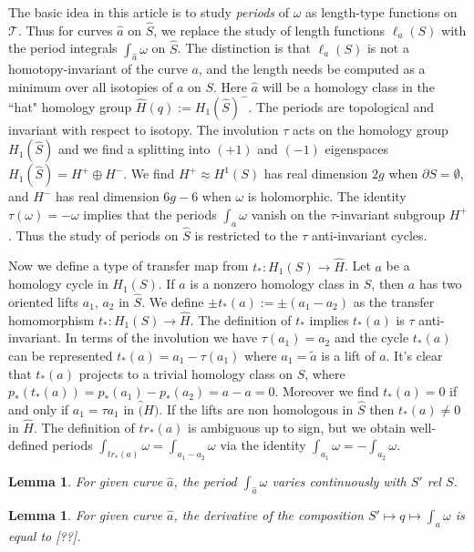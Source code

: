 \documentclass[12pt]{article}
\newtheorem{lem}[thm]{Lemma}
\theoremstyle{definition}
\theoremstyle{remark}
\newcommand{\del}{\partial}
\newcommand{\sT}{\mathscr{T}}
\newcommand{\hS}{\hat{S}}
\begin{document}
The basic idea in this article is to study \emph{periods} of $\omega$ as length-type functions on $\sT$.  Thus for curves $\hat{a}$ on $\hS$, we replace the study of length functions $\ell_a (S)$ with the period integrals $\int_{\hat{a}} \omega$ on $\hS$. The distinction is that $\ell_a(S)$ is not a homotopy-invariant of the curve $a$, and the length needs be computed as a minimum over all isotopies of $a$ on $S$. Here $\hat{a}$ will be a homology class in the ``hat" homology group $\hat{H}(q):= H_1(\hS)^-$. The periods are topological and invariant with respect to isotopy. The involution $\tau$ acts on the homology group $H_1(\hS)$ and we find a splitting into $(+1)$ and $(-1)$ eigenspaces $H_1(\hS)=H^+ \oplus H^-$. We find $H^+ \approx H^1(S)$ has real dimension $2g$ when $\del S=\emptyset$, and $H^-$ has real dimension $6g-6$ when $\omega$ is holomorphic. The identity $\tau (\omega)=-\omega$ implies that the periods $\int_a \omega$ vanish on the $\tau$-invariant subgroup $H^+$. Thus the study of periods on $\hS$ is restricted to the $\tau$ anti-invariant cycles. 

Now we define a type of transfer map from $t_*: H_1(S) \to \hat{H}$. Let $a$ be a homology cycle in $H_1(S)$. If $a$ is a nonzero homology class in $S$, then $a$ has two oriented lifts $a_1$, $a_2$ in $\hS$. We define $\pm t_*(a):=\pm(a_1-a_2)$ as the transfer homomorphism $t_*: H_1(S) \to \hat{H}$. The definition of $t_*$ implies $t_*(a)$ is $\tau$ anti-invariant. In terms of the involution we have $\tau(a_1)=a_2$ and the cycle $t_*(a)$ can be represented $t_*(a)=a_1-\tau(a_1)$ where $a_1=\tilde{a}$ is a lift of $a$. It's clear that $t_*(a)$ projects to a trivial homology class on $S$, where $p_*(t_*(a))=p_*(a_1)-p_*(a_2)=a-a=0$. Moreover we find $t_*(a)=0$ if and only if $a_1=\tau a_1$ in $\hat(H)$. If the lifts are non homologous in $\hS$ then $t_*(a)\neq 0$ in $\hat{H}$. The definition of $tr_*(a)$ is ambiguous up to sign, but we obtain well-defined periods $\int_{tr_*(a)}\omega=\int_{a_1-a_2}\omega$ via the identity $\int_{a_1} \omega = -\int_{a_2} \omega$. 

\begin{lem}
For given curve $\hat{a}$, the period $\int_{\hat{a}} \omega$ varies continuously with $S'$ rel $S$.
\end{lem}

\begin{lem}
For given curve $\hat{a}$, the derivative of the composition $S' \mapsto q \mapsto \int_a \omega $ is equal to [??]. 
\end{lem}
\end{document}
